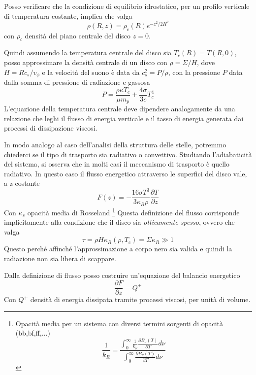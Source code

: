 \documentclass[a4paperbi]{article}
\begin{document}
	Posso verificare che la condizione di equilibrio idrostatico, per un profilo verticale di temperatura costante, implica che valga
	\begin{equation*}
		\rho(R,z)=\rho_c(R)e^{-z^2/2H^2}
	\end{equation*}
	con $\rho_c$ densità del piano centrale del disco $z=0$.
	
	Quindi assumendo la temperatura centrale del disco sia $T_c(R)=T(R,0)$, posso approssimare la densità centrale di un disco con $\rho=\Sigma/H$, dove $H=Rc_s/v_\phi$ e la velocità del suono è data da $c_s^2=P/\rho$, con la pressione $P$ data dalla somma di pressione di radiazione e gassosa
	\begin{equation}
		P=\frac{\rho\kappa T_c}{\mu m_p}+\frac{4\sigma}{3c}T_c^4
	\end{equation}
	L'equazione della temperatura centrale deve dipendere analogamente da una relazione che leghi il flusso di energia verticale e il tasso di energia generata dai processi di dissipazione viscosi. 
	
	In modo analogo al caso dell'analisi della struttura delle stelle, potremmo chiederci se il tipo di trasporto sia  radiativo o convettivo. Studiando l'adiabaticità del sistema, si osserva che in molti casi il meccanismo di trasporto è quello radiativo. In questo caso il flusso energetico attraverso le superfici del disco vale, a z costante
	\begin{equation}
		F(z)=-\frac{16\sigma T^3}{3\kappa_R\rho}\frac{\partial T}{\partial z}
	\end{equation}
	Con $\kappa_s$ opacità media di Rosseland
	\footnote{Opacità media per un sistema con diversi termini sorgenti di opacità (bb,bf,ff,...)\begin{equation}
																							\frac{1}{k_R}=\frac{\int_0^\infty\frac{1}{k_\nu}\frac{\partial B_\nu(T)}{\partial T}d\nu}{\int_0^\infty\frac{\partial B_\nu(T)}{\partial T}d\nu}
																						\end{equation}}
Questa definizione del flusso corrisponde implicitamente alla condizione che il disco sia \textit{otticamente spesso}, ovvero che valga
	\begin{equation}
		\tau=\rho H\kappa_R(\rho,T_c)=\Sigma\kappa_R\gg 1
	\end{equation}
	Questo perché affinché l'approssimazione a corpo nero sia valida e quindi la radiazione non sia libera di scappare.
	
	Dalla definizione di flusso posso costruire un'equazione del balancio energetico
	\begin{equation}
		\frac{\partial F}{\partial z}=Q^+
	\end{equation}
	Con $Q^+$ densità di energia dissipata tramite processi viscosi, per unità di volume.
	
\end{document}

